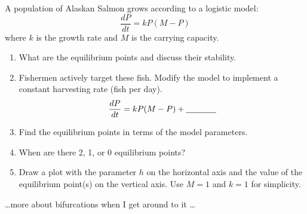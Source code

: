 \begin{problem}
    A population of Alaskan Salmon grows according to a logistic model:
    \[ \frac{dP}{dt} = kP(M-P) \]
    where $k$ is the growth rate and $M$ is the carrying capacity.  
    \begin{enumerate}
        \item What are the equilibrium points and discuss their stability.
        \item Fishermen actively target these fish.  Modify the model to implement a
            constant harvesting rate (fish per day).
            \[ \frac{dP}{dt} = kP(M-P) + \underline{\hspace{0.5in}} \]
        \item Find the equilibrium points in terms of the model parameters.
        \item When are there 2, 1, or 0 equilibrium points?
        \item Draw a plot with the parameter $h$ on the horizontal axis and the value of
            the equilibrium point(s) on the vertical axis. Use $M = 1$ and $k = 1$ for
            simplicity.
    \end{enumerate}
\end{problem}



\ldots more about bifurcations when I get around to it \ldots
